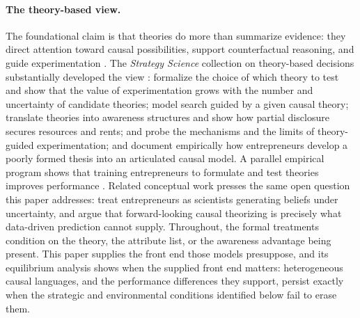 \documentclass[11pt]{article}
\theoremstyle{definition}
\begin{document}
\paragraph{The theory-based view.}
The foundational claim is that theories do more than summarize evidence: they
direct attention toward causal possibilities, support counterfactual
reasoning, and guide experimentation \citep{FelinZenger2017}.  The
\emph{Strategy Science} collection on theory-based decisions substantially
developed the view \citep{FelinGambardellaZenger2024}:
\citet{CamuffoEtAl2024} formalize the choice of which theory to test and show
that the value of experimentation grows with the number and uncertainty of
candidate theories; \citet{ChavdaGansStern2024} model search guided by a
given causal theory; \citet{EhrigZenger2024} translate theories into
awareness structures and show how partial disclosure secures resources and
rents; \citet{Sorenson2024} and \citet{AdnerLevinthal2024} probe the
mechanisms and the limits of theory-guided experimentation; and
\citet{OttHannah2024} document empirically how entrepreneurs develop a
poorly formed thesis into an articulated causal model.  A parallel empirical
program shows that training entrepreneurs to formulate and test theories
improves performance \citep{CamuffoEtAl2020}.  Related conceptual work
presses the same open question this paper addresses: \citet{ZellwegerZenger2023}
treat entrepreneurs as scientists generating beliefs under uncertainty, and
\citet{FelinHolweg2024} argue that forward-looking causal theorizing is
precisely what data-driven prediction cannot supply.  Throughout, the
formal treatments condition on the theory, the attribute list, or the
awareness advantage being present.  This paper supplies the front end those
models presuppose, and its equilibrium analysis shows when the supplied front
end matters: heterogeneous causal languages, and the performance differences
they support, persist exactly when the strategic and environmental conditions
identified below fail to erase them.
\end{document}
